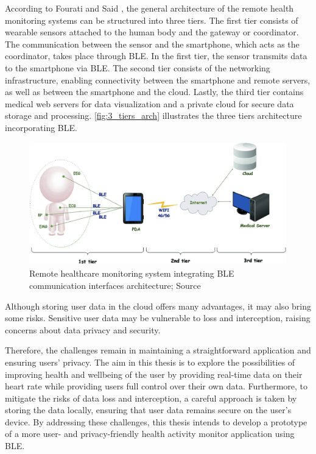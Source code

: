 According to Fourati and Said \autocite{chaari2020remote}, the general architecture of the remote health monitoring systems can be structured into three tiers.
The first tier consists of wearable sensors attached to the human body and the gateway or coordinator. The communication between the sensor and the smartphone, which acts as the coordinator, takes place through BLE. In the first tier, the sensor transmits data to the smartphone via BLE.
The second tier consists of the networking infrastructure, enabling connectivity between the smartphone and remote servers, as well as between the smartphone and the cloud. 
Lastly, the third tier contains medical web servers for data visualization and a private cloud for secure data storage and processing. 
\autoref{fig:3_tiers_arch} illustrates the three tiers architecture incorporating BLE.
\begin{figure}[H]
  \centering
  \includegraphics[width=1\textwidth]{images/3-tiers-arch.png}
  \caption{Remote healthcare monitoring system integrating BLE communication interfaces architecture; Source \autocite{chaari2020remote}}
  \label{fig:3_tiers_arch}
\end{figure}

Although storing user data in the cloud offers many advantages, it may also bring some risks.
Sensitive user data may be vulnerable to loss and interception, raising concerns about data privacy and security. \autocite{kapoor2020privacy}

Therefore, the challenges remain in maintaining a straightforward application and ensuring users' privacy. The aim in this thesis is to explore the possibilities of improving health and wellbeing of the user by providing real-time data on their heart rate while providing users full control over their own data.
Furthermore, to mitigate the risks of data loss and interception, a careful approach is taken by storing the data locally, ensuring that user data remains secure on the user's device.
By addressing these challenges, this thesis intends to develop a prototype of a more user- and privacy-friendly health activity monitor application using BLE.
\newpage

